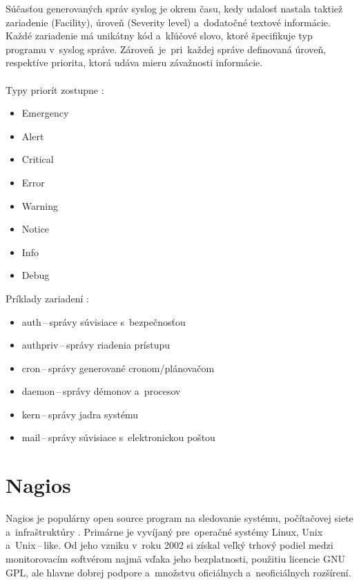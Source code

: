 Súčasťou generovaných správ syslog je okrem času, kedy udalosť nastala taktiež zariadenie (Facility), úroveň (Severity level) a~dodatočné textové informácie. Každé zariadenie má unikátny kód a~kľúčové slovo, ktoré špecifikuje typ programu v~syslog správe. \mbox{Zároveň je}~pri~každej správe definovaná úroveň, respektíve priorita, ktorá udáva mieru závažnosti informácie. \cite{pro-admin-book} \cite{rfc-syslog}
\\\\
Typy priorít zostupne \cite{rfc-syslog}:
\begin{itemize}
	\item Emergency
	\item Alert
	\item Critical
	\item Error
	\item Warning
	\item Notice
	\item Info
	\item Debug\\
\end{itemize}
\noindent
Príklady zariadení \cite{pro-admin-book}:
\begin{itemize}
	\item auth\,--\,správy súvisiace s~bezpečnosťou
	\item authpriv\,--\,správy riadenia prístupu
	\item cron\,--\,správy generované cronom/plánovačom
	\item daemon\,--\,správy démonov a~procesov
	\item kern\,--\,správy jadra systému
	\item mail\,--\,správy súvisiace s~elektronickou poštou\\
\end{itemize}


\section{Nagios}
Nagios je populárny open source program na sledovanie systému, počítačovej siete a~infraštruktúry \cite{nagios-web}. Primárne je vyvíjaný pre~operačné systémy Linux, Unix a~Unix\,--\,like. Od jeho vzniku v~roku 2002 si získal veľký trhový podiel medzi monitorovacím softvérom najmä vďaka jeho bezplatnosti, použitiu licencie GNU GPL, ale hlavne dobrej podpore a~množstvu oficiálnych a~neoficiálnych rozšírení.

